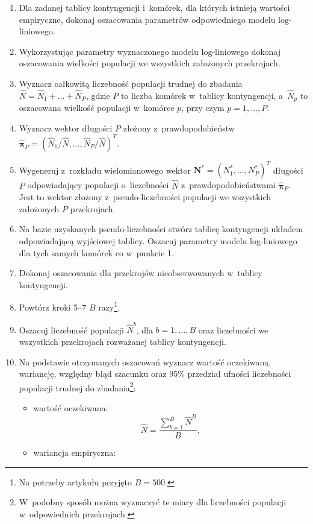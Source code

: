 \documentclass[12pt,a4paper]{article}
\begin{document}
\begin{enumerate}
    \item Dla zadanej tablicy kontyngencji i~komórek, dla których istnieją wartości empiryczne, dokonaj oszacowania parametrów odpowiedniego modelu log-liniowego. 
    \item Wykorzystując parametry wyznaczonego modelu log-liniowego dokonaj oszacowania wielkości populacji we wszystkich założonych przekrojach. 
    \item Wyznacz całkowitą liczebność populacji trudnej do zbadania $\hat{N} = \hat{N}_1 +\ldots+ \hat{N}_P$, gdzie $P$ to liczba komórek w~tablicy kontyngencji, a~$\hat{N}_p$ to oszacowana wielkość populacji w~komórce $p$, przy czym $p=1,\ldots,P$.
    \item Wyznacz wektor długości $P$ złożony z~prawdopodobieństw $\hat{\boldsymbol{\pi}}_P = (\hat{N}_1 / \hat{N},\ldots, \hat{N}_P / \hat{N})^T$.
   \item Wygeneruj z~rozkładu wielomianowego wektor $\boldsymbol{N}^* = ({N}^*_1,\ldots, {N}^*_P)^T$ długości $P$ odpowiadający  populacji o~liczebności $\hat{N}$ z~prawdopodobieństwami $\hat{\boldsymbol{\pi}}_P$. Jest to wektor złożony z~pseudo-liczebności populacji we wszystkich założonych $P$ przekrojach.
    \item Na bazie uzyskanych pseudo-liczebności stwórz tablicę kontyngencji układem odpowiadającą wyjściowej tablicy. Oszacuj parametry modelu log-liniowego dla tych samych komórek co w~punkcie 1.
    \item Dokonaj oszacowania dla przekrojów nieobserwowanych w~tablicy kontyngencji.
    \item Powtórz kroki 5--7 $B$ razy\footnote{Na potrzeby artykułu przyjęto $B=500$.}.
    \item Oszacuj liczebność populacji $\hat{N}^{b}$, dla $b=1,\ldots,B$ oraz liczebności we wszystkich przekrojach rozważanej tablicy kontyngencji.   
    \item Na podstawie otrzymanych oszacowań wyznacz wartość oczekiwaną, wariancję, względny błąd szacunku oraz 95\% przedział ufności liczebności populacji trudnej do zbadania\footnote{W~podobny sposób można wyznaczyć te miary dla liczebności populacji w~odpowiednich przekrojach.}:
    \begin{itemize}
        \item wartość oczekiwana:
    \begin{equation}
    \hat{N}=\frac{\sum_{b=1}^{B}\hat{N}^{B}}{B},    
    \end{equation}
      \item wariancja empiryczna:

\end{itemize}
\end{enumerate}
\end{document}
